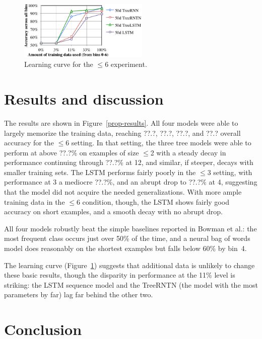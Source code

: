 \begin{figure}[t]
  \centering
      \includegraphics[height=1.1in]{lcc.pdf}
  \caption{Learning curve for the $\le6$ experiment.}
  \label{fig:lc} 
\end{figure}

\section{Results and discussion}\label{sec:discussion}

The results are shown in Figure~\ref{prop-results}. All four models were able to largely memorize the training data, reaching ??.?, ??.?, ??.?, and ??.? overall accuracy for the $\le$6 setting. In that setting, the three tree models were able to perform at above ??.?\% on examples of size $\le$2 with a steady decay in performance continuing through ??.?\% at 12, and similar, if steeper, decays with smaller training sets. The LSTM performs fairly poorly in the $\le3$ setting, with performance at 3 a mediocre ??.?\%, and an abrupt drop to ??.?\% at 4, suggesting that the model did not acquire the needed generalizations. With more ample training data in the $\le6$ condition, though, the LSTM shows fairly good accuracy on short examples, and a smooth decay with no abrupt drop. 

All four models robustly beat the simple baselines reported in Bowman et al.: the most frequent class occurs just over 50\% of the time, and a neural bag of words model does reasonably on the shortest examples but falls below 60\% by bin~4.

The learning curve (Figure~\ref{fig:lc}) suggests that additional data is unlikely to change these basic results, though the disparity in performance at the 11\% level is striking: the LSTM sequence model and the TreeRNTN (the model with the most parameters by far) lag far behind the other two.

\section{Conclusion}

